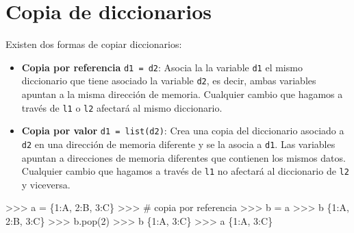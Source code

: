\documentclass[
  spanish,
  a4paper,
]{scrreport}
\newenvironment{Shaded}{\begin{snugshade}}{\end{snugshade}}
\newcommand{\CommentTok}[1]{\textcolor[rgb]{0.37,0.37,0.37}{#1}}
\newcommand{\DecValTok}[1]{\textcolor[rgb]{0.68,0.00,0.00}{#1}}
\newcommand{\NormalTok}[1]{\textcolor[rgb]{0.00,0.23,0.31}{#1}}
\newcommand{\OperatorTok}[1]{\textcolor[rgb]{0.37,0.37,0.37}{#1}}
\newcommand{\StringTok}[1]{\textcolor[rgb]{0.13,0.47,0.30}{#1}}
\providecommand{\tightlist}{%
  \setlength{\itemsep}{0pt}\setlength{\parskip}{0pt}}
\begin{document}
\section{Copia de diccionarios}\label{copia-de-diccionarios}

Existen dos formas de copiar diccionarios:

\begin{itemize}
\tightlist
\item
  \textbf{Copia por referencia} \texttt{d1\ =\ d2}: Asocia la la
  variable \texttt{d1} el mismo diccionario que tiene asociado la
  variable \texttt{d2}, es decir, ambas variables apuntan a la misma
  dirección de memoria. Cualquier cambio que hagamos a través de
  \texttt{l1} o \texttt{l2} afectará al mismo diccionario.
\item
  \textbf{Copia por valor} \texttt{d1\ =\ list(d2)}: Crea una copia del
  diccionario asociado a \texttt{d2} en una dirección de memoria
  diferente y se la asocia a \texttt{d1}. Las variables apuntan a
  direcciones de memoria diferentes que contienen los mismos datos.
  Cualquier cambio que hagamos a través de \texttt{l1} no afectará al
  diccionario de \texttt{l2} y viceversa.
\end{itemize}

\begin{Shaded}
\begin{Highlighting}[]
\OperatorTok{\textgreater{}\textgreater{}\textgreater{}}\NormalTok{ a }\OperatorTok{=}\NormalTok{ \{}\DecValTok{1}\NormalTok{:}\StringTok{\textquotesingle{}A\textquotesingle{}}\NormalTok{, }\DecValTok{2}\NormalTok{:}\StringTok{\textquotesingle{}B\textquotesingle{}}\NormalTok{, }\DecValTok{3}\NormalTok{:}\StringTok{\textquotesingle{}C\textquotesingle{}}\NormalTok{\}}
\OperatorTok{\textgreater{}\textgreater{}\textgreater{}} \CommentTok{\# copia por referencia}
\OperatorTok{\textgreater{}\textgreater{}\textgreater{}}\NormalTok{ b }\OperatorTok{=}\NormalTok{ a}
\OperatorTok{\textgreater{}\textgreater{}\textgreater{}}\NormalTok{ b}
\NormalTok{\{}\DecValTok{1}\NormalTok{:}\StringTok{\textquotesingle{}A\textquotesingle{}}\NormalTok{, }\DecValTok{2}\NormalTok{:}\StringTok{\textquotesingle{}B\textquotesingle{}}\NormalTok{, }\DecValTok{3}\NormalTok{:}\StringTok{\textquotesingle{}C\textquotesingle{}}\NormalTok{\}}
\OperatorTok{\textgreater{}\textgreater{}\textgreater{}}\NormalTok{ b.pop(}\DecValTok{2}\NormalTok{)}
\OperatorTok{\textgreater{}\textgreater{}\textgreater{}}\NormalTok{ b}
\NormalTok{\{}\DecValTok{1}\NormalTok{:}\StringTok{\textquotesingle{}A\textquotesingle{}}\NormalTok{, }\DecValTok{3}\NormalTok{:}\StringTok{\textquotesingle{}C\textquotesingle{}}\NormalTok{\}}
\OperatorTok{\textgreater{}\textgreater{}\textgreater{}}\NormalTok{ a}
\NormalTok{\{}\DecValTok{1}\NormalTok{:}\StringTok{\textquotesingle{}A\textquotesingle{}}\NormalTok{, }\DecValTok{3}\NormalTok{:}\StringTok{\textquotesingle{}C\textquotesingle{}}\NormalTok{\}}
\end{Highlighting}
\end{Shaded}
\end{document}
